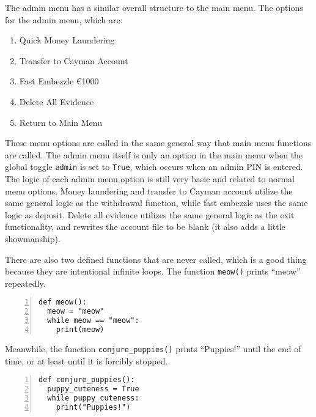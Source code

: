 \documentclass{article}
\begin{document}
The admin menu has a similar overall structure to the main menu. The options for the admin menu, which are:
\begin{enumerate}
	\item Quick Money Laundering
	\item Transfer to Cayman Account
	\item Fast Embezzle €1000
	\item Delete All Evidence
	\item Return to Main Menu
\end{enumerate}
These menu options are called in the same general way that main menu functions are called. The admin menu itself is only an option in the main menu when the global toggle \texttt{admin} is set to \texttt{True}, which occurs when an admin PIN is entered. The logic of each admin menu option is still very basic and related to normal menu options. Money laundering and transfer to Cayman account utilize the same general logic as the withdrawal function, while fast embezzle uses the same logic as deposit. Delete all evidence utilizes the same general logic as the exit functionality, and rewrites the account file to be blank (it also adds a little showmanship).

There are also two defined functions that are never called, which is a good thing because they are intentional infinite loops. The function \texttt{meow()} prints ``meow'' repeatedly.
\begin{lstlisting}[numbers=left]
def meow():
  meow = "meow"
  while meow == "meow":
    print(meow)
\end{lstlisting}
Meanwhile, the function \texttt{conjure\_puppies()} prints ``Puppies!'' until the end of time, or at least until it is forcibly stopped.
\begin{lstlisting}[numbers=left]
def conjure_puppies():
  puppy_cuteness = True
  while puppy_cuteness:
    print("Puppies!")
\end{lstlisting}
\end{document}
